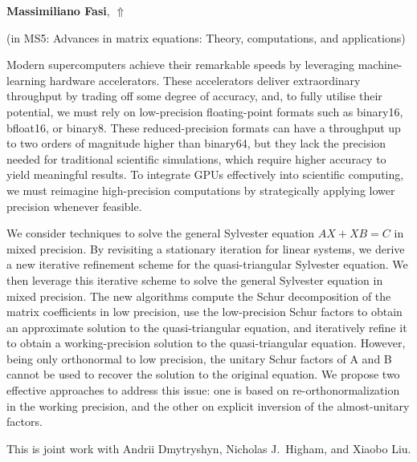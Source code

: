 \documentclass[ILAS2025-program.tex]{subfiles}
\begin{document}
\hypertarget{down0066}{}\begin{ilasabstract}
    
\textbf{Massimiliano Fasi},  \hfill \hyperlink{up0066}{$\Uparrow$}
    
    
(in {\color{mstitle}MS5: Advances in matrix equations: Theory, computations, and applications})
        
\mtskip
    Modern supercomputers achieve their remarkable speeds by leveraging machine-learning hardware accelerators.
These accelerators deliver extraordinary throughput by trading off some degree of accuracy, and, to fully utilise their potential, we must rely on low-precision floating-point formats such as binary16, bfloat16, or binary8.
These reduced-precision formats can have a throughput up to two orders of magnitude higher than binary64, but they lack the precision needed for traditional scientific simulations, which require higher accuracy to yield meaningful results.
To integrate GPUs effectively into scientific computing, we must reimagine high-precision computations by strategically applying lower precision whenever feasible.

We consider techniques to solve the general Sylvester equation $AX + XB = C$ in mixed precision.
By revisiting a stationary iteration for linear systems, we derive a new iterative refinement scheme for the quasi-triangular Sylvester equation.
We then leverage this iterative scheme to solve the general Sylvester equation in mixed precision.
The new algorithms compute the Schur decomposition of the matrix coefficients in low precision, use the low-precision Schur factors to obtain an approximate solution to the quasi-triangular equation, and iteratively refine it to obtain a working-precision solution to the quasi-triangular equation.
However, being only orthonormal to low precision, the unitary Schur factors of A and B cannot be used to recover the solution to the original equation.
We propose two effective approaches to address this issue: one is based on re-orthonormalization in the working precision, and the other on explicit inversion of the almost-unitary factors.

This is joint work with Andrii Dmytryshyn, Nicholas J.~Higham, and Xiaobo Liu.
 
\end{ilasabstract}
    
\end{document}
